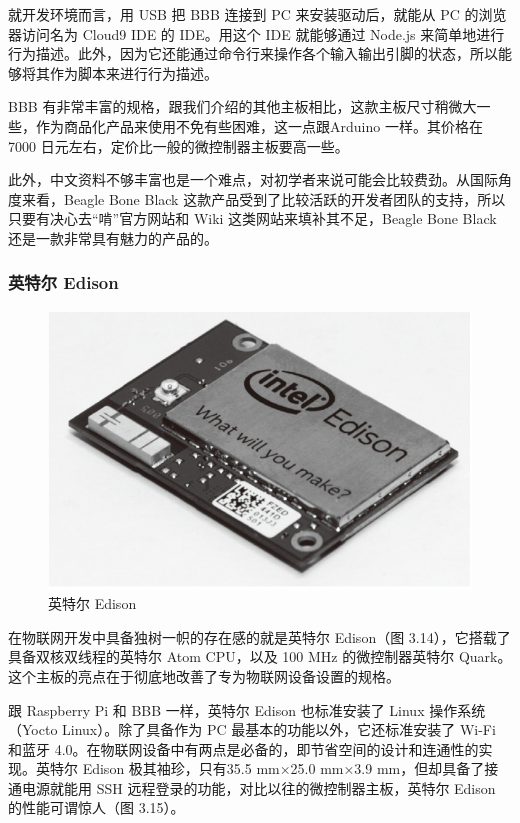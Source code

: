 \documentclass[12pt,UTF8]{ctexbook}
\begin{document}
就开发环境而言，用 USB 把 BBB 连接到 PC 来安装驱动后，就能从 PC 的浏览器访问名为 Cloud9 IDE 的 IDE。用这个 IDE 就能够通过 Node.js 来简单地进行行为描述。此外，因为它还能通过命令行来操作各个输入输出引脚的状态，所以能够将其作为脚本来进行行为描述。

BBB 有非常丰富的规格，跟我们介绍的其他主板相比，这款主板尺寸稍微大一些，作为商品化产品来使用不免有些困难，这一点跟Arduino 一样。其价格在 7000 日元左右，定价比一般的微控制器主板要高一些。

此外，中文资料不够丰富也是一个难点，对初学者来说可能会比较费劲。从国际角度来看，Beagle Bone Black 这款产品受到了比较活跃的开发者团队的支持，所以只要有决心去“啃”官方网站和 Wiki 这类网站来填补其不足，Beagle Bone Black 还是一款非常具有魅力的产品的。

\subsubsection{英特尔 Edison}

\begin{figure}[htbp]
	\centering
	\includegraphics[width=1\linewidth]{65}
	\caption{英特尔 Edison}
	\label{fig:1}
\end{figure}

在物联网开发中具备独树一帜的存在感的就是英特尔 Edison（图 3.14），它搭载了具备双核双线程的英特尔 Atom CPU，以及 100 MHz 的微控制器英特尔 Quark。这个主板的亮点在于彻底地改善了专为物联网设备设置的规格。

跟 Raspberry Pi 和 BBB 一样，英特尔 Edison 也标准安装了 Linux 操作系统（Yocto Linux）。除了具备作为 PC 最基本的功能以外，它还标准安装了 Wi-Fi 和蓝牙 4.0。在物联网设备中有两点是必备的，即节省空间的设计和连通性的实现。英特尔 Edison 极其袖珍，只有35.5 mm×25.0 mm×3.9 mm，但却具备了接通电源就能用 SSH 远程登录的功能，对比以往的微控制器主板，英特尔 Edison 的性能可谓惊人（图 3.15）。
\end{document}

